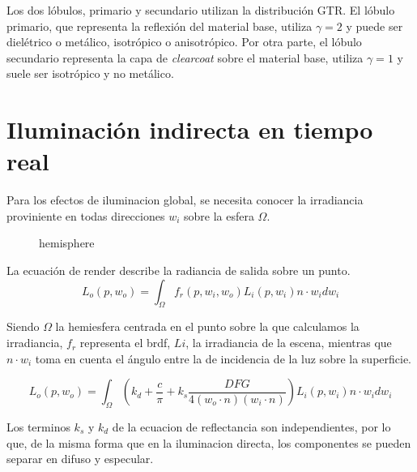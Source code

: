     
                Los dos l\'obulos, primario y secundario utilizan la distribuci\'on GTR. El l\'obulo primario,
                que representa la reflexi\'on del material base, utiliza $\gamma = 2$ y puede ser diel\'etrico o met\'alico,
                isotr\'opico o anisotr\'opico. Por otra parte, el l\'obulo secundario representa la capa de \textit{clearcoat}
                sobre el material base, utiliza $\gamma = 1$ y suele ser isotr\'opico y no met\'alico.
    
    
    
    \section{Iluminaci\'on indirecta en tiempo real}
    
    Para los efectos de iluminacion global, se necesita conocer la irradiancia proviniente en todas
    direcciones $w_i$ sobre la esfera $\Omega$.\\
    
    \begin{figure}[H]
        \vspace{0.5cm}
        \centering
        \caption{hemisphere}
      \end{figure}
      \singlespacing
    
    La ecuaci\'on de render describe la radiancia de salida sobre un punto.
    \begin{equation}
    L_o(p, w_o) = \int_{\Omega} f_r(p, w_i, w_o)L_i(p, w_i)n\cdot{w_i}dw_i
    \end{equation}
    \singlespacing
    
    Siendo $\Omega$ la hemiesfera centrada en el punto sobre la que calculamos la irradiancia,
    $f_r$ representa el brdf, $Li$, la irradiancia de la escena, mientras que $n\cdot{w_i}$ toma en
    cuenta el \'angulo entre la de incidencia de la luz sobre la superficie.
    
    \begin{equation}
    L_o(p, w_o) = \int_{\Omega} (k_d + \frac{c}{\pi} + 
    k_s \frac{DFG}{4(w_o\cdot{n})(w_i\cdot{n})})L_i(p, w_i)n\cdot{w_i}dw_i
    \end{equation}
    \singlespacing
    
    Los terminos $k_s$ y $k_d$ de la ecuacion de reflectancia son independientes, por lo que, de la
    misma forma que en la iluminacion directa, los componentes se pueden separar en difuso y
    especular.
    
